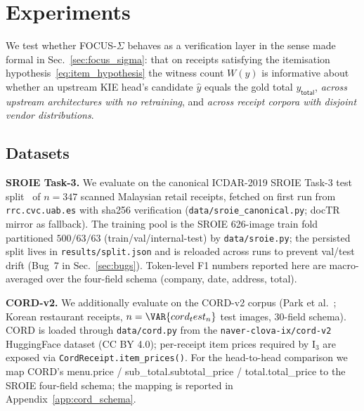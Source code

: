 
\section{Experiments}
\label{sec:experiments}

We test whether FOCUS-$\Sigma$ behaves as a verification layer in the
sense made formal in Sec.~\ref{sec:focus_sigma}: that on receipts
satisfying the itemisation hypothesis~\eqref{eq:item_hypothesis} the
witness count $W(\hat y)$ is informative about whether an upstream
KIE head's candidate $\hat y$ equals the gold total $y_{\textsf{total}}$,
\emph{across upstream architectures with no retraining}, and
\emph{across receipt corpora with disjoint vendor distributions}.

\subsection{Datasets}
\label{sec:experiments_data}

\textbf{SROIE Task-3.}  We evaluate on the canonical ICDAR-2019 SROIE
Task-3 test split~\cite{huang2019icdar} of $n=347$ scanned Malaysian
retail receipts, fetched on first run from \texttt{rrc.cvc.uab.es}
with sha256 verification (\texttt{data/sroie\_canonical.py}; docTR
mirror as fallback).  The training pool is the SROIE 626-image train
fold partitioned $500/63/63$ (train/val/internal-test) by
\texttt{data/sroie.py}; the persisted split lives in
\texttt{results/split.json} and is reloaded across runs to prevent
val/test drift (Bug~7 in Sec.~\ref{sec:bugs}).  Token-level F1 numbers
reported here are macro-averaged over the four-field schema
(\textsf{company}, \textsf{date}, \textsf{address}, \textsf{total}).

\textbf{CORD-v2.}  We additionally evaluate on the CORD-v2 corpus
(Park et al.~\cite{park2019cord}; Korean restaurant receipts,
$n=\VAR{cord_test_n}$ test images, 30-field schema).  CORD is loaded
through \texttt{data/cord.py} from the \texttt{naver-clova-ix/cord-v2}
HuggingFace dataset (CC BY 4.0); per-receipt item prices required by
$\mathrm{I}_3$ are exposed via \texttt{CordReceipt.item\_prices()}.
For the head-to-head comparison we map CORD's
\textsf{menu.price} / \textsf{sub\_total.subtotal\_price} /
\textsf{total.total\_price} to the SROIE four-field schema; the
mapping is reported in Appendix~\ref{app:cord_schema}.

